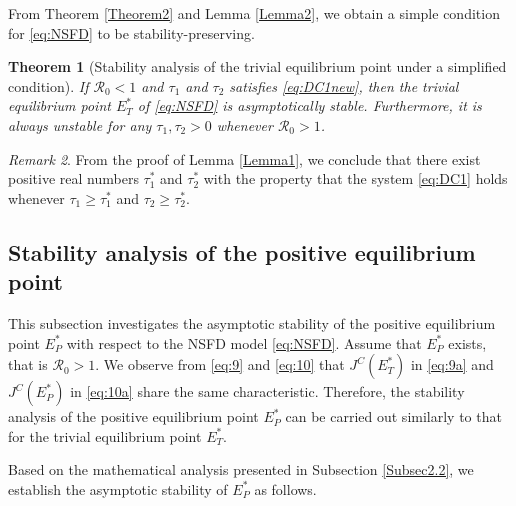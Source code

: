 \documentclass[12pt]{article}
\newtheorem{theorem}{Theorem}[section]
\theoremstyle{definition}
\theoremstyle{remark}
\newtheorem{remark}[theorem]{Remark}
\numberwithin{equation}{section}
\begin{document}
From Theorem \ref{Theorem2} and Lemma \ref{Lemma2}, we obtain a simple condition for \eqref{eq:NSFD} to be stability-preserving.
\begin{theorem}[Stability analysis of the trivial equilibrium point under a simplified condition]\label{Theorem3}
If $\mathcal{R}_0 < 1$ and $\tau_1$ and $\tau_2$ satisfies \eqref{eq:DC1new}, then the trivial equilibrium point $E_T^*$ of \eqref{eq:NSFD} is asymptotically stable. Furthermore, it is always unstable for any $\tau_1, \tau_2 > 0$ whenever $\mathcal{R}_0 > 1$.
\end{theorem}
\begin{remark}
From the proof of Lemma \ref{Lemma1}, we conclude that there exist positive real numbers $\tau_1^*$ and $\tau_2^*$ with the property that the system \eqref{eq:DC1} holds whenever $\tau_1 \geq \tau_1^*$ and $\tau_2 \geq \tau_2^*$.
\end{remark}
\subsection{Stability analysis of the positive equilibrium point}
This subsection investigates the asymptotic stability of the positive equilibrium point $E_P^*$ with respect to the NSFD model \eqref{eq:NSFD}. Assume that $E_P^*$ exists, that is $\mathcal{R}_0 > 1$. We observe from \eqref{eq:9} and \eqref{eq:10} that $J^C(E_T^*)$ in \eqref{eq:9a} and $J^C(E_P^*)$ in \eqref{eq:10a} share the same characteristic. Therefore, the stability analysis of the positive equilibrium point $E_P^*$ can be carried out similarly to that for the trivial equilibrium point $E_T^*$.

Based on  the mathematical analysis presented in Subsection \ref{Subsec2.2}, we establish the asymptotic stability of $E_P^*$ as follows.
\end{document}
